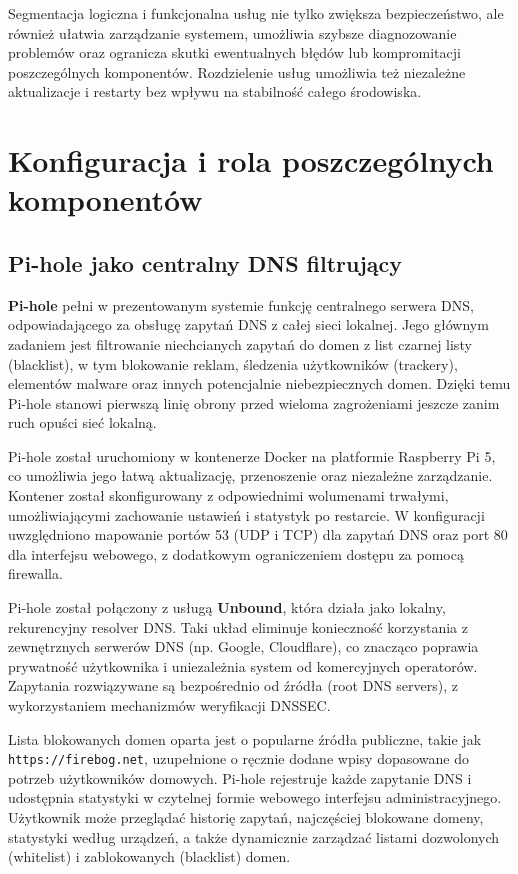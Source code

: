 \documentclass[
    left=2.5cm,         %
    right=2.5cm,        %
    top=2.5cm,          %
    bottom=3cm,         %
    bindingoffset=6mm,  %
    nohyphenation=true %
]{eiti/eiti-thesis} %
\begin{document}
Segmentacja logiczna i funkcjonalna usług nie tylko zwiększa bezpieczeństwo, ale również ułatwia zarządzanie systemem, umożliwia szybsze diagnozowanie problemów oraz ogranicza skutki ewentualnych błędów lub kompromitacji poszczególnych komponentów. Rozdzielenie usług umożliwia też niezależne aktualizacje i restarty bez wpływu na stabilność całego środowiska.

\newpage 
\section{Konfiguracja i rola poszczególnych komponentów}
\subsection{Pi-hole jako centralny DNS filtrujący}

\textbf{Pi-hole} pełni w prezentowanym systemie funkcję centralnego serwera DNS, odpowiadającego za obsługę zapytań DNS z całej sieci lokalnej. Jego głównym zadaniem jest filtrowanie niechcianych zapytań do domen z list czarnej listy (blacklist), w tym blokowanie reklam, śledzenia użytkowników (trackery), elementów malware oraz innych potencjalnie niebezpiecznych domen. Dzięki temu Pi-hole \cite{pihole-docs} stanowi pierwszą linię obrony przed wieloma zagrożeniami jeszcze zanim ruch opuści sieć lokalną.

Pi-hole został uruchomiony w kontenerze Docker na platformie Raspberry Pi 5, co umożliwia jego łatwą aktualizację, przenoszenie oraz niezależne zarządzanie. Kontener został skonfigurowany z odpowiednimi wolumenami trwałymi, umożliwiającymi zachowanie ustawień i statystyk po restarcie. W konfiguracji uwzględniono mapowanie portów 53 (UDP i TCP) dla zapytań DNS oraz port 80 dla interfejsu webowego, z dodatkowym ograniczeniem dostępu za pomocą firewalla.

Pi-hole został połączony z usługą \textbf{Unbound}, która działa jako lokalny, rekurencyjny resolver DNS. Taki układ eliminuje konieczność korzystania z zewnętrznych serwerów DNS (np. Google, Cloudflare), co znacząco poprawia prywatność użytkownika i uniezależnia system od komercyjnych operatorów. Zapytania rozwiązywane są bezpośrednio od źródła (root DNS servers), z wykorzystaniem mechanizmów weryfikacji DNSSEC.

Lista blokowanych domen oparta jest o popularne źródła publiczne, takie jak \texttt{https://firebog.net}, uzupełnione o ręcznie dodane wpisy dopasowane do potrzeb użytkowników domowych. Pi-hole rejestruje każde zapytanie DNS i udostępnia statystyki w czytelnej formie webowego interfejsu administracyjnego. Użytkownik może przeglądać historię zapytań, najczęściej blokowane domeny, statystyki według urządzeń, a także dynamicznie zarządzać listami dozwolonych (whitelist) i zablokowanych (blacklist) domen.
\end{document}
